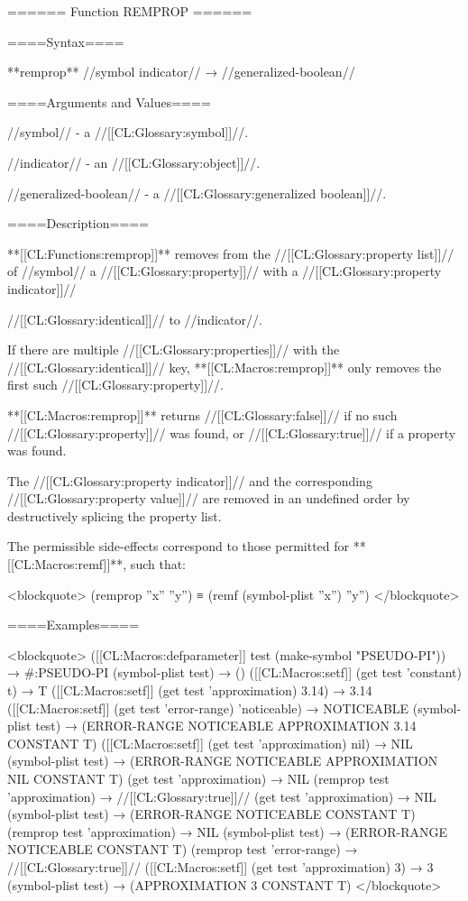 ====== Function REMPROP ======

====Syntax====

**remprop** //symbol indicator// → //generalized-boolean//

====Arguments and Values====

//symbol// - a //[[CL:Glossary:symbol]]//.

//indicator// - an //[[CL:Glossary:object]]//.

//generalized-boolean// - a //[[CL:Glossary:generalized boolean]]//.

====Description====

**[[CL:Functions:remprop]]** removes from the //[[CL:Glossary:property list]]// of //symbol// a //[[CL:Glossary:property]]// with a //[[CL:Glossary:property indicator]]//

//[[CL:Glossary:identical]]// to //indicator//.

If there are multiple //[[CL:Glossary:properties]]// with the //[[CL:Glossary:identical]]// key, **[[CL:Macros:remprop]]** only removes the first such //[[CL:Glossary:property]]//.

**[[CL:Macros:remprop]]** returns //[[CL:Glossary:false]]// if no such //[[CL:Glossary:property]]// was found, or //[[CL:Glossary:true]]// if a property was found.

The //[[CL:Glossary:property indicator]]// and the corresponding //[[CL:Glossary:property value]]// are removed in an undefined order by destructively splicing the property list.

The permissible side-effects correspond to those permitted for **[[CL:Macros:remf]]**, such that:

<blockquote> (remprop ''x'' ''y'') ≡ (remf (symbol-plist ''x'') ''y'') </blockquote>

====Examples====

<blockquote> ([[CL:Macros:defparameter]] test (make-symbol "PSEUDO-PI")) → #:PSEUDO-PI (symbol-plist test) → () ([[CL:Macros:setf]] (get test 'constant) t) → T ([[CL:Macros:setf]] (get test 'approximation) 3.14) → 3.14 ([[CL:Macros:setf]] (get test 'error-range) 'noticeable) → NOTICEABLE (symbol-plist test) → (ERROR-RANGE NOTICEABLE APPROXIMATION 3.14 CONSTANT T) ([[CL:Macros:setf]] (get test 'approximation) nil) → NIL (symbol-plist test) → (ERROR-RANGE NOTICEABLE APPROXIMATION NIL CONSTANT T) (get test 'approximation) → NIL (remprop test 'approximation) → //[[CL:Glossary:true]]// (get test 'approximation) → NIL (symbol-plist test) → (ERROR-RANGE NOTICEABLE CONSTANT T) (remprop test 'approximation) → NIL (symbol-plist test) → (ERROR-RANGE NOTICEABLE CONSTANT T) (remprop test 'error-range) → //[[CL:Glossary:true]]// ([[CL:Macros:setf]] (get test 'approximation) 3) → 3 (symbol-plist test) → (APPROXIMATION 3 CONSTANT T) </blockquote>


